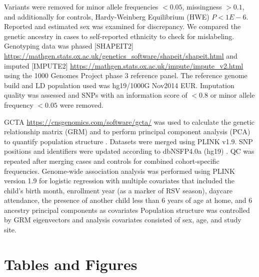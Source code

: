 \documentclass{article}
\begin{document}
Variants were removed for minor allele frequencies $<0.05$, missingness $>0.1$, 
and additionally for controls, Hardy-Weinberg Equilibrium (HWE) $P <1E-6$.
Reported and estimated sex was examined for discrepancy. 
We compared the genetic ancestry in cases to self-reported ethnicity to check for mislabeling. 
Genotyping data was phased 
[SHAPEIT2]
\url{https://mathgen.stats.ox.ac.uk/genetics_software/shapeit/shapeit.html}
and imputed 
[IMPUTE2] 
\url{https://mathgen.stats.ox.ac.uk/impute/impute_v2.html}
using the 1000 Genomes Project phase 3 reference panel. 
The reference genome build and LD population used was hg19/1000G Nov2014 EUR. 
Imputation quality was assessed and SNPs with an information score of $<0.8$ or minor allele frequency $<0.05$ were removed.

GCTA \url{https://cnsgenomics.com/software/gcta/}
was used to calculate the genetic relationship matrix (GRM) and to 
perform principal component analysis (PCA) 
to quantify population structure 
\cite{yang_gcta_2011}. 
Datasets were merged using PLINK v1.9. SNP positions and identifiers were 
updated according to dbNSFP4.0a (hg19) 
\cite{liu_dbnsfp_2016}.
QC was repeated after merging cases and controls for combined cohort-specific 
frequencies. 
Genome-wide association analysis was performed using PLINK version 1.9 for logistic regression with multiple covariates that included the child’s birth month, enrollment year (as a marker of RSV season), daycare attendance, the presence of another child less than 6 years of age at home, and 6 ancestry principal components as covariates
Population structure was controlled by GRM eigenvectors and analysis covariates consisted of sex, age, and study site.





\section{Tables and Figures}
\end{document}
